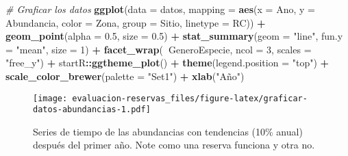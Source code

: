 \documentclass[]{krantz}
\newenvironment{Shaded}{\begin{snugshade}}{\end{snugshade}}
\newcommand{\CommentTok}[1]{\textcolor[rgb]{0.56,0.35,0.01}{\textit{#1}}}
\newcommand{\DataTypeTok}[1]{\textcolor[rgb]{0.13,0.29,0.53}{#1}}
\newcommand{\DecValTok}[1]{\textcolor[rgb]{0.00,0.00,0.81}{#1}}
\newcommand{\FloatTok}[1]{\textcolor[rgb]{0.00,0.00,0.81}{#1}}
\newcommand{\KeywordTok}[1]{\textcolor[rgb]{0.13,0.29,0.53}{\textbf{#1}}}
\newcommand{\NormalTok}[1]{#1}
\newcommand{\OperatorTok}[1]{\textcolor[rgb]{0.81,0.36,0.00}{\textbf{#1}}}
\newcommand{\StringTok}[1]{\textcolor[rgb]{0.31,0.60,0.02}{#1}}
\begin{document}
\begin{Shaded}
\begin{Highlighting}[]
\CommentTok{# Graficar los datos}
\KeywordTok{ggplot}\NormalTok{(}\DataTypeTok{data =}\NormalTok{ datos,}
       \DataTypeTok{mapping =} \KeywordTok{aes}\NormalTok{(}\DataTypeTok{x =}\NormalTok{ Ano, }\DataTypeTok{y =}\NormalTok{ Abundancia,}
                     \DataTypeTok{color =}\NormalTok{ Zona, }\DataTypeTok{group =}\NormalTok{ Sitio, }\DataTypeTok{linetype =}\NormalTok{ RC)) }\OperatorTok{+}
\StringTok{  }\KeywordTok{geom_point}\NormalTok{(}\DataTypeTok{alpha =} \FloatTok{0.5}\NormalTok{, }\DataTypeTok{size =} \FloatTok{0.5}\NormalTok{) }\OperatorTok{+}
\StringTok{  }\KeywordTok{stat_summary}\NormalTok{(}\DataTypeTok{geom =} \StringTok{"line"}\NormalTok{, }\DataTypeTok{fun.y =} \StringTok{"mean"}\NormalTok{, }\DataTypeTok{size =} \DecValTok{1}\NormalTok{) }\OperatorTok{+}
\StringTok{  }\KeywordTok{facet_wrap}\NormalTok{(}\OperatorTok{~}\NormalTok{GeneroEspecie, }\DataTypeTok{ncol =} \DecValTok{3}\NormalTok{, }\DataTypeTok{scales =} \StringTok{"free_y"}\NormalTok{) }\OperatorTok{+}
\StringTok{  }\NormalTok{startR}\OperatorTok{::}\KeywordTok{ggtheme_plot}\NormalTok{() }\OperatorTok{+}
\StringTok{  }\KeywordTok{theme}\NormalTok{(}\DataTypeTok{legend.position =} \StringTok{"top"}\NormalTok{) }\OperatorTok{+}
\StringTok{  }\KeywordTok{scale_color_brewer}\NormalTok{(}\DataTypeTok{palette =} \StringTok{"Set1"}\NormalTok{) }\OperatorTok{+}
\StringTok{  }\KeywordTok{xlab}\NormalTok{(}\StringTok{"Año"}\NormalTok{)}
\end{Highlighting}
\end{Shaded}

\begin{figure}
\centering
\texttt{[image: evaluacion-reservas\_files/figure-latex/graficar-datos-abundancias-1.pdf]}
\caption{\label{fig:graficar-datos-abundancias}Series de tiempo de las abundancias con tendencias (10\% anual) después del primer año. Note como una reserva funciona y otra no.}
\end{figure}
\end{document}
